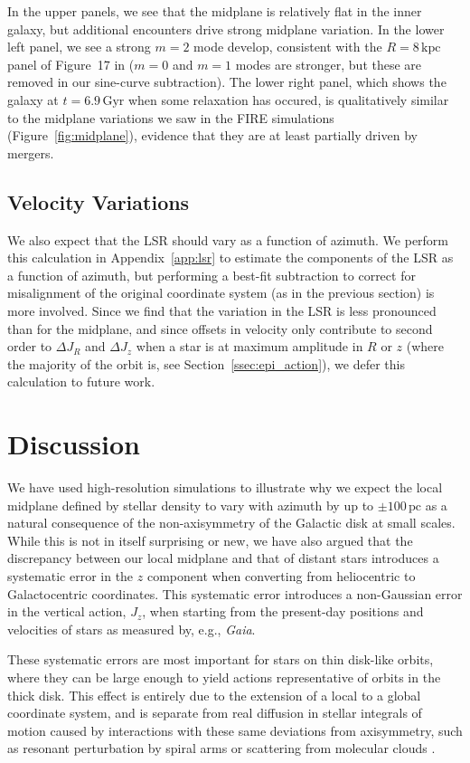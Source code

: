 \documentclass[twocolumn]{aastex62}
\newcommand{\pc}{\text{pc}}
\newcommand{\kpc}{\text{kpc}}
\newcommand{\Gyr}{\text{Gyr}}
\begin{document}
In the upper panels, we see that the midplane is relatively flat in the inner
galaxy, but additional encounters drive strong midplane variation. In the
lower left panel, we see a strong $m=2$ mode develop, consistent with the
$R=8\,\kpc$ panel of Figure~17 in \citet{2018MNRAS.481..286L} ($m=0$ and $m=1$
modes are stronger, but these are removed in our sine-curve subtraction). The
lower right panel, which shows the galaxy at $t=6.9\,\Gyr$ when some
relaxation has occured, is qualitatively similar to the midplane variations we
saw in the FIRE simulations (Figure~\ref{fig:midplane}), evidence that they
are at least partially driven by mergers.

\subsection{Velocity Variations} \label{ssec:lsr_var}
We also expect that the LSR should vary as a function of azimuth. We perform
this calculation in Appendix~\ref{app:lsr} to estimate the components of the
LSR as a function of azimuth, but performing a best-fit subtraction to correct
for misalignment of the original coordinate system (as in the previous
section) is more involved. Since we find that the variation in the LSR is less
pronounced than for the midplane, and since offsets in velocity only
contribute to second order to $\Delta J_R$ and $\Delta J_z$ when a star is at
maximum amplitude in $R$ or $z$ (where the majority of the orbit is, see
Section~\ref{ssec:epi_action}), we defer this calculation to future work.

\section{Discussion} \label{sec:discussion}
We have used high-resolution simulations to illustrate why we expect the local
midplane defined by stellar density to vary with azimuth by up to $\pm
100\,\pc$ as a natural consequence of the non-axisymmetry of the Galactic disk
at small scales. While this is not in itself surprising or new, we have also
argued that the discrepancy between our local midplane and that of distant
stars introduces a systematic error in the $z$ component when converting from
heliocentric to Galactocentric coordinates. This systematic error introduces a
non-Gaussian error in the vertical action, $J_z$, when starting from the
present-day positions and velocities of stars as measured by, e.g.,
\textit{Gaia}.

These systematic errors are most important for stars on thin disk-like orbits,
where they can be large enough to yield actions representative of orbits in
the thick disk. This effect is entirely due to the extension of a local to a
global coordinate system, and is separate from real diffusion in stellar
integrals of motion caused by interactions with these same deviations from
axisymmetry, such as resonant perturbation by spiral arms or scattering from
molecular clouds \citep{2014RvMP...86....1S}.
\end{document}
